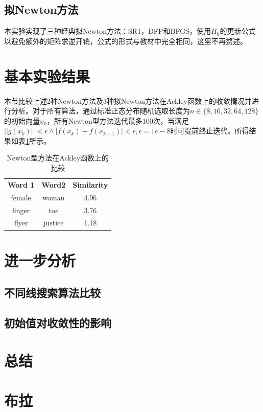 \documentclass{article}
\begin{document}
\subsection{拟Newton方法}
本实验实现了三种经典拟Newton方法：SR1，DFP和BFGS，使用$H_k$的更新公式以避免额外的矩阵求逆开销，公式的形式与教材中完全相同，这里不再赘述。

\section{基本实验结果}
本节比较上述2种Newton方法及3种拟Newton方法在Ackley函数上的收敛情况并进行分析。对于所有算法，通过标准正态分布随机选取长度为$n\in \{ 8, 16, 32, 64, 128 \}$的初始向量$x_0$，所有Newton型方法迭代最多100次，当满足$||g(x_k)|| < \epsilon \wedge |f(x_{k}) - f(x_{k-1})| < \epsilon, \epsilon=1e-8$时可提前终止迭代。所得结果如表\ref{tab:overall}所示。

\begin{table}[h]
  \centering
  \begin{tabular}{c c c}
    \toprule
    \bfseries Word 1 & \bfseries Word2 & \bfseries Similarity \\
    \cmidrule(lr){1-3}
    female & woman & 4.96 \\
    finger & toe & 3.76 \\
    flyer & justice & 1.18\\
    \bottomrule
  \end{tabular}
  \caption{Newton型方法在Ackley函数上的比较}
  \label{tab:overall}
\end{table}


\section{进一步分析}
\subsection{不同线搜索算法比较}

\subsection{初始值对收敛性的影响}

\section{总结}

\section{布拉}
\end{document}
